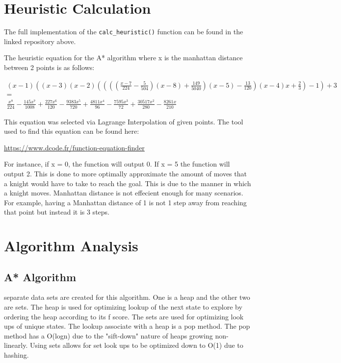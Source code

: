\documentclass[12pt, letterpaper, final, onecolumn, titlepage] {article}
\begin{document}
\section{Heuristic Calculation}

\noindent The full implementation of the \texttt{calc\_heuristic()} function can be found in the linked repository above.

\noindent The heuristic equation for the A* algorithm where x is the manhattan distance between 2 points is as follows:

\vspace{0.5cm}

\begin{math}
\begin{array}{c} (x-1) \left((x-3) (x-2) \left(\left(\left(\left(\frac{x-7}{224}-\frac{5}{504}\right) (x-8)+\frac{149}{5040}\right) (x-5)-\frac{13}{120}\right) (x-4) x+\frac{2}{3}\right)-1\right)+3 \\ = \\ \frac{x^8}{224}-\frac{145 x^7}{1008}+\frac{227 x^6}{120}-\frac{9383 x^5}{720}+\frac{4811 x^4}{96}-\frac{7595 x^3}{72}+\frac{30517 x^2}{280}-\frac{8261 x}{210} \end{array}
\end{math}

\vspace{0.7cm}

\noindent This equation was selected via Lagrange Interpolation of given points.
\noindent The tool used to find this equation can be found here:

\url{https://www.dcode.fr/function-equation-finder}

\noindent For instance, if x = 0, the function will output 0. If x = 5 the function will output 2.
\noindent This is done to more optimally approximate the amount of moves that a knight would have to take to reach the goal.  This is due to the manner in which a knight moves.  Manhattan distance is not effecient enough for many scenarios. For example, having a Manhattan distance of 1 is not 1 step away from reaching that point but instead it is 3 steps.

\newpage

\section{Algorithm Analysis}
\subsection{A* Algorithm}
 separate data sets are created for this algorithm.  One is a heap and the other two are sets.  The heap is used for optimizing lookup of the next state to explore by ordering the heap according to its f score.  The sets are used for optimizing look ups of unique states.  The lookup associate with a heap is a pop method.  The pop method has a O(logn) due to the "sift-down" nature of heaps growing non-linearly.  Using sets allows for set look ups to be optimized down to O(1) due to hashing.  
\end{document}
